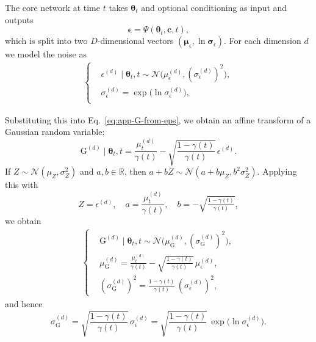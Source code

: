 The core network at time $t$ takes $\boldsymbol{\theta}_t$ and optional conditioning as input and outputs
\begin{equation}
    \boldsymbol{\epsilon}
    =
    \Psi(\boldsymbol{\theta}_t, \mathbf{c}, t),
\end{equation}
which is split into two $D$-dimensional vectors $(\boldsymbol{\mu}_\epsilon, \ln\boldsymbol{\sigma}_\epsilon)$.
For each dimension $d$ we model the noise as
\begin{equation}
    \begin{aligned}
        \left\{
    \begin{aligned}
        & \epsilon^{(d)} \mid \boldsymbol{\theta}_t, t \sim \mathcal{N}\!\big( \mu_\epsilon^{(d)}, (\sigma_\epsilon^{(d)})^2 \big), \\
        & \sigma_\epsilon^{(d)} = \exp\bigl(\ln\sigma_\epsilon^{(d)}\bigr), \\
    \end{aligned}
    \right.
    \end{aligned}
\end{equation}

Substituting this into Eq.~\eqref{eq:app-G-from-eps}, we obtain an affine transform of a Gaussian random variable:
\begin{equation}
    \mathrm{G}^{(d)} \mid \boldsymbol{\theta}_t, t
    =
    \frac{\mu_t^{(d)}}{\gamma(t)}
    -
    \sqrt{\frac{1-\gamma(t)}{\gamma(t)}}\,
    \epsilon^{(d)}.
\end{equation}
If $Z \sim \mathcal{N}(\mu_Z, \sigma_Z^2)$ and $a,b \in \mathbb{R}$, then $a + bZ \sim \mathcal{N}(a + b\mu_Z, b^2\sigma_Z^2)$.  
Applying this with
\[
    Z = \epsilon^{(d)},\quad
    a = \frac{\mu_t^{(d)}}{\gamma(t)},\quad
    b = -\sqrt{\tfrac{1-\gamma(t)}{\gamma(t)}},
\]
we obtain
\begin{equation}
    \begin{aligned}
        \left\{
    \begin{aligned}
        & \mathrm{G}^{(d)} \mid \boldsymbol{\theta}_t, t \sim \mathcal{N}\!\Big( \mu_\mathrm{G}^{(d)}, (\sigma_\mathrm{G}^{(d)})^2 \Big), \\
        & \mu_\mathrm{G}^{(d)} = \frac{\mu_t^{(d)}}{\gamma(t)} - \sqrt{\frac{1-\gamma(t)}{\gamma(t)}}\,\mu_\epsilon^{(d)}, \\
        & (\sigma_\mathrm{G}^{(d)})^2 = \frac{1-\gamma(t)}{\gamma(t)}\, (\sigma_\epsilon^{(d)})^2,
    \end{aligned}
    \right.
    \end{aligned}
\end{equation}
and hence
\begin{equation}
    \sigma_\mathrm{G}^{(d)}
    =
    \sqrt{\frac{1-\gamma(t)}{\gamma(t)}}\,
    \sigma_\epsilon^{(d)}
    =
    \sqrt{\frac{1-\gamma(t)}{\gamma(t)}}\,
    \exp\bigl(\ln\sigma_\epsilon^{(d)}\bigr).
\end{equation}

